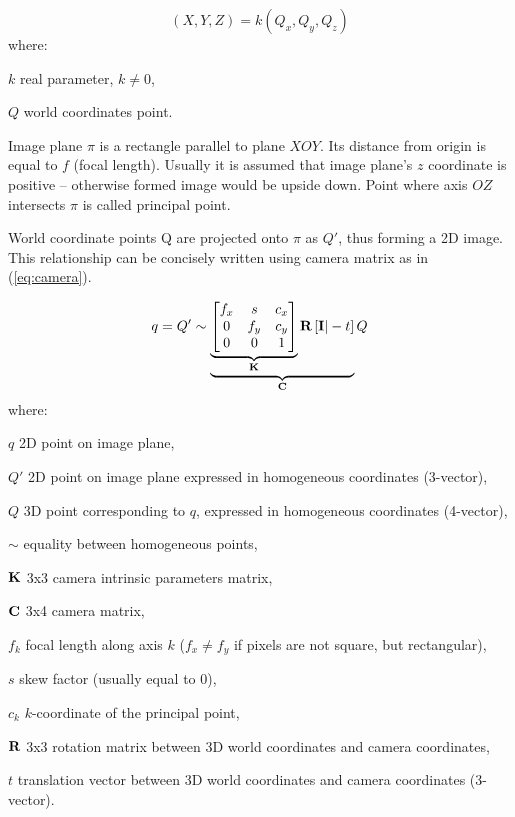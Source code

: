 \begin{equation}
(X, Y, Z) = k(Q_x, Q_y, Q_z)
\label{eq:homo}
\end{equation}
where:
\begin{eqwhere}[2cm]
	\item[$k$] real parameter, \(k \neq 0\),
	\item[$Q$] world coordinates point.
\end{eqwhere}

Image plane \(\pi\) is a rectangle parallel to plane \(XOY\). Its distance from origin is equal to \(f\) (focal length). Usually it is assumed that image plane's \(z\) coordinate is positive -- otherwise formed image would be upside down. Point where axis \(OZ\) intersects \(\pi\) is called principal point.

World coordinate points Q are projected onto \(\pi\) as \(Q'\), thus forming a 2D image. This relationship can be concisely written using camera matrix as in (\ref{eq:camera}).


\begin{equation}
q = Q' \sim \underbrace{ \underbrace{  \begin{bmatrix}
		f_{x} & s & c_{x} \\ 
		0 & f_{y} & c_{y} \\ 
		0 & 0 & 1
	\end{bmatrix}
}_{\textbf{K}} \textbf{R} \left [ \textbf{I} | -t \right ] }_{\textbf{C}} Q
\label{eq:camera}
\end{equation}
where:
\begin{eqwhere}[2cm]
	\item[$q$] 2D point on image plane,
	\item[$Q'$] 2D point on image plane expressed in homogeneous coordinates (3-vector),
	\item[$Q$] 3D point corresponding to $q$, expressed in homogeneous coordinates (4-vector),
	\item[$\sim$] equality between homogeneous points,
	\item[$\textbf{K}$] 3x3 camera intrinsic parameters matrix,
	\item[$\textbf{C}$] 3x4 camera matrix,
	\item[$f_{k}$] focal length along axis $k$ ($f_{x} \neq f_{y}$ if pixels are not square, but rectangular),
	\item[$s$] skew factor (usually equal to 0),
	\item[$c_{k}$] $k$-coordinate of the principal point,
	\item[$\textbf{R}$] 3x3 rotation matrix between 3D world coordinates and camera coordinates,
	\item[$t$] translation vector between 3D world coordinates and camera coordinates (3-vector).
\end{eqwhere}


